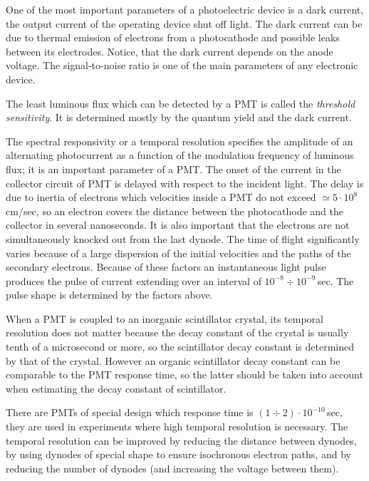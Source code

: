 One of the most important parameters of a photoelectric device is a dark current, the output current of the operating device shut off light. The dark current can be due to thermal emission of electrons from a photocathode and possible leaks between its electrodes. Notice, that the dark current depends on the anode voltage. The signal-to-noise ratio is one of the main parameters of any electronic device.

The least luminous flux which can be detected by a PMT is called the \emph{threshold sensitivity}. It is determined mostly by the quantum yield and the dark current.

The spectral responsivity or a temporal resolution specifies the amplitude of an alternating photocurrent as a function of the modulation frequency of luminous flux; it is an important parameter of a PMT. The onset of the current in the collector circuit of PMT is delayed with respect to the incident light. The delay is due to inertia of electrons which velocities inside a PMT do not exceed $\simeq5\cdot10^8\,$cm/sec, so an electron covers the distance between the photocathode and the collector in several nanoseconds. It is also important that the electrons are not simultaneously knocked out from the last dynode. The time of flight significantly varies because of a large dispersion of the initial velocities and the paths of the secondary electrons. Because of these factors an instantaneous light pulse produces the pulse of current extending over an interval of $10^{-8}\div 10^{-9}\,$sec. The pulse shape is determined by the factors above.

When a PMT is coupled to an inorganic scintillator crystal, its temporal resolution does not matter because the decay constant of the crystal is usually tenth of a microsecond or more, so the scintillator decay constant is determined by that of the crystal. However an organic scintillator decay constant can be comparable to the PMT response time, so the latter should be taken into account when estimating the decay constant of scintillator. 

There are PMTs of special design which response time is $(1\div 2)\cdot10^{-10}\,$sec, they are used in experiments where high temporal resolution is necessary. The temporal resolution can be improved by reducing the distance between dynodes, by using dynodes of special shape to ensure isochronous electron paths, and by reducing the number of dynodes (and increasing the voltage between them).
